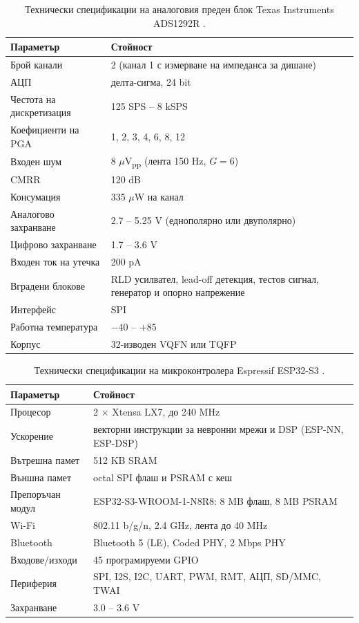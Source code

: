 \documentclass[12pt,a4paper]{article}
\begin{document}
\begin{table}[htbp]
    \centering
    \begin{tabular}{l l}
        \toprule
        Параметър & Стойност \\
        \midrule
        Брой канали & 2 (канал 1 с измерване на импеданса за дишане) \\
        АЦП & делта-сигма, 24 bit \\
        Честота на дискретизация & 125 SPS -- 8 kSPS \\
        Коефициенти на PGA & 1, 2, 3, 4, 6, 8, 12 \\
        Входен шум & 8 \(\mu\)V\textsubscript{pp} (лента 150 Hz, \(G = 6\)) \\
        CMRR & 120 dB \\
        Консумация & 335 \(\mu\)W на канал \\
        Аналогово захранване & 2.7 -- 5.25 V (еднополярно или двуполярно) \\
        Цифрово захранване & 1.7 -- 3.6 V \\
        Входен ток на утечка & 200 pA \\
        Вградени блокове & RLD усилвател, lead-off детекция, тестов сигнал, генератор и опорно напрежение \\
        Интерфейс & SPI \\
        Работна температура & \(-40\) -- \(+85\) \textcelsius{} \\
        Корпус & 32-изводен VQFN или TQFP \\
        \bottomrule
    \end{tabular}
    \caption{Технически спецификации на аналоговия преден блок Texas Instruments ADS1292R \cite{ti_ads1292r}.}
    \label{tab:spec_ads}
\end{table}

\begin{table}[htbp]
    \centering
    \begin{tabular}{l l}
        \toprule
        Параметър & Стойност \\
        \midrule
        Процесор & 2 \(\times\) Xtensa LX7, до 240 MHz \\
        Ускорение & векторни инструкции за невронни мрежи и DSP (ESP-NN, ESP-DSP) \\
        Вътрешна памет & 512 KB SRAM \\
        Външна памет & octal SPI флаш и PSRAM с кеш \\
        Препоръчан модул & ESP32-S3-WROOM-1-N8R8: 8 MB флаш, 8 MB PSRAM \\
        Wi-Fi & 802.11 b/g/n, 2.4 GHz, лента до 40 MHz \\
        Bluetooth & Bluetooth 5 (LE), Coded PHY, 2 Mbps PHY \\
        Входове/изходи & 45 програмируеми GPIO \\
        Периферия & SPI, I2S, I2C, UART, PWM, RMT, АЦП, SD/MMC, TWAI \\
        Захранване & 3.0 -- 3.6 V \\
        \bottomrule
    \end{tabular}
    \caption{Технически спецификации на микроконтролера Espressif ESP32-S3 \cite{espressif_esp32s3}.}
    \label{tab:spec_esp}
\end{table}
\end{document}
